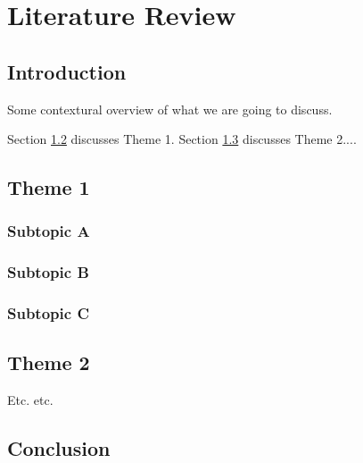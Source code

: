 \chapter{Literature Review}\label{chap:litrev}

\section{Introduction}\label{sec:litrev:intro}

Some contextural overview of what we are going to discuss.

Section \ref{sec:litrev:theme1} discusses Theme 1. Section \ref{sec:litrev:theme2} discusses Theme 2....

\section{Theme 1}\label{sec:litrev:theme1}

\subsection{Subtopic A}\label{sec:litrev:theme1:A}

\subsection{Subtopic B}\label{sec:litrev:theme1:B}

\subsection{Subtopic C}\label{sec:litrev:theme1:C}

\section{Theme 2}\label{sec:litrev:theme2}

Etc. etc.

\section{Conclusion}\label{sec:litrev:conclusion}
